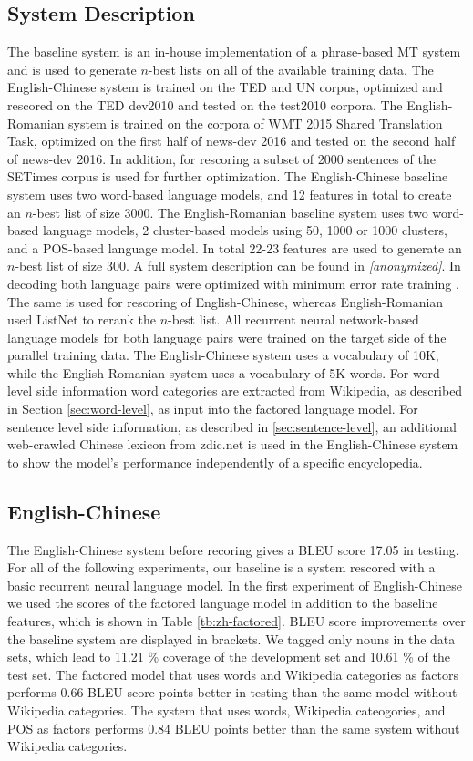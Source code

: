 \documentclass[a4paper]{article}
\newcommand{\anony}[1]{\textit{[anonymized]}}
\begin{document}
\subsection{System Description}
The baseline system is an in-house implementation of a phrase-based MT system and is used to generate $n$-best lists on all of the available training data. The English-Chinese system is trained on the TED and UN corpus, optimized and rescored on the TED dev2010 and tested on the test2010 corpora.
The English-Romanian system is trained on the corpora of WMT 2015 Shared Translation Task, optimized on the first half of news-dev 2016 and tested on the second half of news-dev 2016. In addition, for rescoring a subset of 2000 sentences of the SETimes corpus is used for further optimization.
The English-Chinese baseline system uses two word-based language models, and 12 features in total to create an $n$-best list of size 3000.
The English-Romanian baseline system uses two word-based language models, 2 cluster-based models using 50, 1000 or 1000 clusters, and a POS-based language model. In total 22-23 features are used to generate an $n$-best list of size 300. A full system description can be found in \anony{niehuesusing}.
In decoding both language pairs were optimized with minimum error rate training \cite{och2003minimum}. The same is used for rescoring of English-Chinese, whereas English-Romanian used ListNet to rerank the $n$-best list.
All recurrent neural network-based language models for both language pairs were trained on the target side of the parallel training data. The English-Chinese system uses a vocabulary of 10K, while the English-Romanian system uses a vocabulary of 5K words. For word level side information word categories are extracted from Wikipedia, as described in Section \ref{sec:word-level}, as input into the factored language model.
For sentence level side information, as described in \ref{sec:sentence-level}, an additional web-crawled Chinese lexicon from zdic.net \cite{zdic} is used in the English-Chinese system to show the model's performance independently of a specific encyclopedia.


\subsection{English-Chinese}
The English-Chinese system before recoring gives a BLEU score 17.05 in testing. For all of the following experiments, our baseline is a system rescored with a basic recurrent neural language model.
In the first experiment of English-Chinese we used the scores of the factored language model in addition to the baseline features, which is shown in Table \ref{tb:zh-factored}. BLEU score improvements over the baseline system are displayed in brackets. We tagged only nouns in the data sets, which lead to 11.21 \% coverage of the development set and 10.61 \% of the test set. The factored model that uses words and Wikipedia categories as factors performs 0.66 BLEU score points better in testing than the same model without Wikipedia categories. The system that uses words, Wikipedia cateogories, and POS as factors performs 0.84 BLEU points better than the same system without Wikipedia categories.
\end{document}
